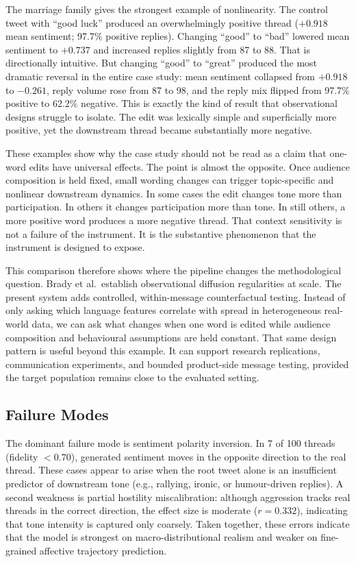 \documentclass[logo,bsc,singlespacing,parskip,online]{infthesis}
\begin{document}
The marriage family gives the strongest example of nonlinearity. The control tweet with ``good luck'' produced an overwhelmingly positive thread ($+0.918$ mean sentiment; 97.7\% positive replies). Changing ``good'' to ``bad'' lowered mean sentiment to $+0.737$ and increased replies slightly from 87 to 88. That is directionally intuitive. But changing ``good'' to ``great'' produced the most dramatic reversal in the entire case study: mean sentiment collapsed from $+0.918$ to $-0.261$, reply volume rose from 87 to 98, and the reply mix flipped from 97.7\% positive to 62.2\% negative. This is exactly the kind of result that observational designs struggle to isolate. The edit was lexically simple and superficially more positive, yet the downstream thread became substantially more negative.

These examples show why the case study should not be read as a claim that one-word edits have universal effects. The point is almost the opposite. Once audience composition is held fixed, small wording changes can trigger topic-specific and nonlinear downstream dynamics. In some cases the edit changes tone more than participation. In others it changes participation more than tone. In still others, a more positive word produces a more negative thread. That context sensitivity is not a failure of the instrument. It is the substantive phenomenon that the instrument is designed to expose.

This comparison therefore shows where the pipeline changes the methodological question. Brady et al.\ establish observational diffusion regularities at scale. The present system adds controlled, within-message counterfactual testing. Instead of only asking which language features correlate with spread in heterogeneous real-world data, we can ask what changes when one word is edited while audience composition and behavioural assumptions are held constant. That same design pattern is useful beyond this example. It can support research replications, communication experiments, and bounded product-side message testing, provided the target population remains close to the evaluated setting.

\subsection{Failure Modes}

The dominant failure mode is sentiment polarity inversion. In 7 of 100 threads (fidelity $< 0.70$), generated sentiment moves in the opposite direction to the real thread. These cases appear to arise when the root tweet alone is an insufficient predictor of downstream tone (e.g., rallying, ironic, or humour-driven replies). A second weakness is partial hostility miscalibration: although aggression tracks real threads in the correct direction, the effect size is moderate ($r = 0.332$), indicating that tone intensity is captured only coarsely. Taken together, these errors indicate that the model is strongest on macro-distributional realism and weaker on fine-grained affective trajectory prediction.
\end{document}
